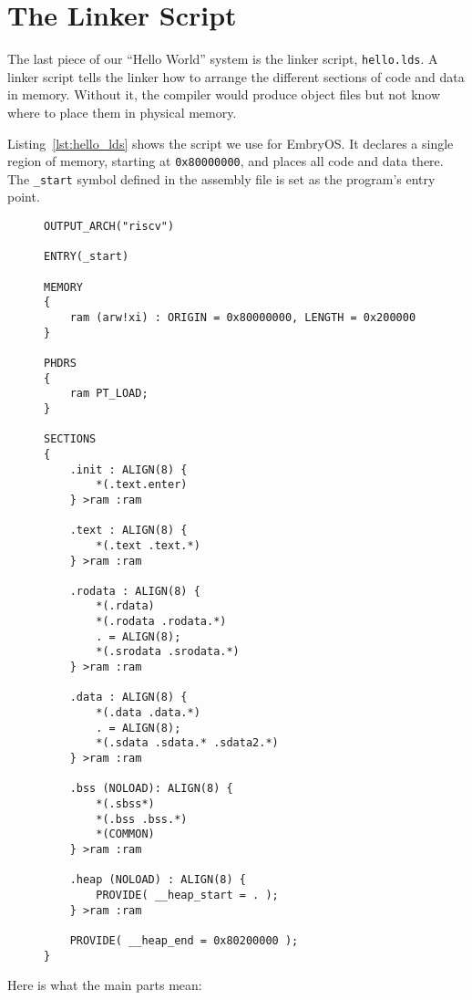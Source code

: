 \section{The Linker Script}

The last piece of our ``Hello World'' system is the linker script,
\texttt{hello.lds}.  A linker script tells the linker how to arrange the
different sections of code and data in memory.  Without it, the compiler would
produce object files but not know where to place them in physical memory.

Listing~\ref{lst:hello_lds} shows the script we use for EmbryOS.  It declares a
single region of memory, starting at \texttt{0x80000000}, and places all code
and data there.  The \texttt{\_start} symbol defined in the assembly file is set
as the program’s entry point.

\begin{figure}[H]
\centering
\begin{minipage}{0.95\textwidth}
\begin{lstlisting}[style=oscode,language={},caption={Linker script \texttt{hello.lds} for EmbryOS},label={lst:hello_lds}]
OUTPUT_ARCH("riscv")

ENTRY(_start)

MEMORY
{
    ram (arw!xi) : ORIGIN = 0x80000000, LENGTH = 0x200000
}

PHDRS
{
    ram PT_LOAD;
}

SECTIONS
{
    .init : ALIGN(8) {
        *(.text.enter)
    } >ram :ram

    .text : ALIGN(8) {
        *(.text .text.*)
    } >ram :ram

    .rodata : ALIGN(8) {
        *(.rdata)
        *(.rodata .rodata.*)
        . = ALIGN(8);
        *(.srodata .srodata.*)
    } >ram :ram

    .data : ALIGN(8) {
        *(.data .data.*)
        . = ALIGN(8);
        *(.sdata .sdata.* .sdata2.*)
    } >ram :ram

    .bss (NOLOAD): ALIGN(8) {
        *(.sbss*)
        *(.bss .bss.*)
        *(COMMON)
    } >ram :ram

    .heap (NOLOAD) : ALIGN(8) {
        PROVIDE( __heap_start = . );
    } >ram :ram

    PROVIDE( __heap_end = 0x80200000 );
}
\end{lstlisting}
\end{minipage}
\end{figure}

Here is what the main parts mean:

